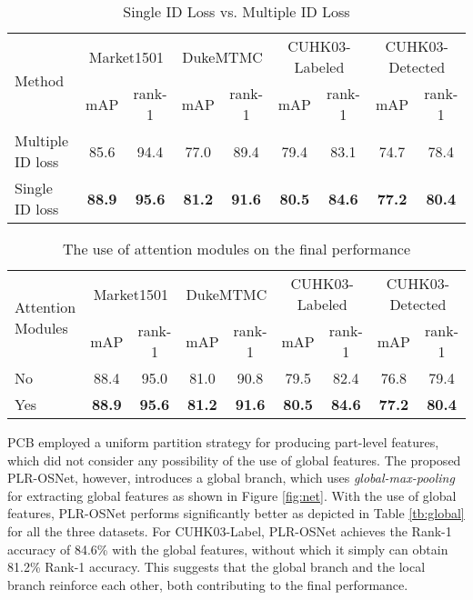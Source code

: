 \documentclass[journal]{IEEEtran}
\begin{document}
\begin{table*}[ht]
\begin{center}
\begin{tabular}{l|c@{\hskip 5pt}c@{\hskip 5pt}|c@{\hskip 5pt}c@{\hskip 5pt}|c@{\hskip 5pt}c@{\hskip 5pt}|c@{\hskip 5pt}c@{\hskip 5pt}}
\toprule[1.5pt]
\multirow{2}{*}{Method} &	\multicolumn{2}{c|}{Market1501}	 &	\multicolumn{2}{c|}{DukeMTMC} &	\multicolumn{2}{c|}{CUHK03-Labeled}	&			\multicolumn{2}{c}{CUHK03-Detected}			\\
\cline{2-9}
	&	mAP 	&	rank-1 &	mAP 	&	rank-1  &	mAP 	&	rank-1	&	mAP 	&	rank-1	\\
\hline\hline
Multiple ID loss	&	85.6	&	94.4 &	77.0	&	89.4 &	79.4	&	83.1	& 74.7 & 78.4	\\
\hline
Single ID loss  &	\textbf{88.9} &	\textbf{95.6} & \textbf{81.2} &	\textbf{91.6} &	\textbf{80.5}	&	\textbf{84.6}	& \textbf{77.2}	& \textbf{80.4}	\\
\bottomrule[1.5pt]
\end{tabular}
\end{center}
\caption{Single ID Loss vs. Multiple ID Loss}
\label{tb:ID}
\end{table*}


\begin{table*}[ht]
\begin{center}
\begin{tabular}{l|c@{\hskip 5pt}c@{\hskip 5pt}|c@{\hskip 5pt}c@{\hskip 5pt}|c@{\hskip 5pt}c@{\hskip 5pt}|c@{\hskip 5pt}c@{\hskip 5pt}}
\toprule[1.5pt]
\multirow{2}{*}{Attention Modules} &	\multicolumn{2}{c|}{Market1501}	 &	\multicolumn{2}{c|}{DukeMTMC} &	\multicolumn{2}{c|}{CUHK03-Labeled}	&			\multicolumn{2}{c}{CUHK03-Detected}			\\
\cline{2-9}
	&	mAP 	&	rank-1 &	mAP 	&	rank-1  &	mAP 	&	rank-1	&	mAP 	&	rank-1	\\
\hline\hline
No	&	88.4	&	95.0 &	81.0	&	90.8 &	79.5	&	82.4	& 76.8 & 79.4	\\
\hline
Yes &	\textbf{88.9} &	\textbf{95.6} & \textbf{81.2} &	\textbf{91.6} &	\textbf{80.5}	&	\textbf{84.6}	& \textbf{77.2}	& \textbf{80.4}	\\
\bottomrule[1.5pt]
\end{tabular}
\end{center}
\caption{The use of attention modules on the final performance}
\label{tb:att}
\end{table*}
PCB employed a uniform partition strategy for producing part-level features, which did not consider any possibility of the use of global features. The proposed PLR-OSNet, however, introduces a global branch, which uses \textit{global-max-pooling} for extracting global features as shown in Figure \ref{fig:net}.  With the use of global features, PLR-OSNet performs significantly better as depicted in Table \ref{tb:global} for all the three datasets. For CUHK03-Label, PLR-OSNet achieves the Rank-1 accuracy of 84.6\% with the global features, without which it simply can obtain 81.2\% Rank-1 accuracy.   This suggests that the global branch and the local branch reinforce each other, both contributing to the final performance.
\end{document}
